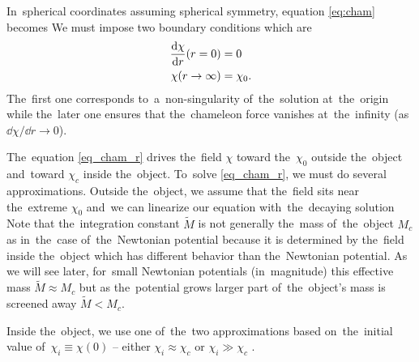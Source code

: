 In~spherical coordinates assuming spherical symmetry, equation \eqref{eq:cham} becomes
We must impose two boundary conditions which are
\begin{align*}
\frac{\mbox{d} \chi}{\mbox{d} r}(r=0)&=0 \\
\chi(r\rightarrow\infty)&=\chi_0.
\end{align*}
The~first one corresponds to~a~non-singularity of~the~solution at~the~origin while the~later one ensures that the~chameleon force vanishes at~the~infinity (as $\dd\chi/\dd r\rightarrow0$).

The~equation \eqref{eq_cham_r} drives the~field $\chi$ toward the~$\chi_0$ outside the~object and~toward $\chi_c$ inside the~object. To~solve \eqref{eq_cham_r}, we must do several approximations. Outside the~object, we assume that the~field sits near the~extreme $\chi_0$ and~we can linearize our equation
with~the~decaying solution
Note that the~integration constant $\tilde{M}$ is not generally the~mass of~the~object $M_c$ as in~the~case of~the~Newtonian potential because it is determined by the~field inside the~object which has different behavior than the~Newtonian potential. As we will see later, for~small Newtonian potentials (in~magnitude) this effective mass $\tilde{M}\approx M_c$ but as the~potential grows larger part of~the~object's mass is screened away $\tilde{M}< M_c$.

Inside the~object, we use one of~the~two approximations based on~the~initial value of~$\chi_i\equiv\chi(0)$ -- either $\chi_i\approx\chi_c$ or $\chi_i\gg\chi_c$ .
